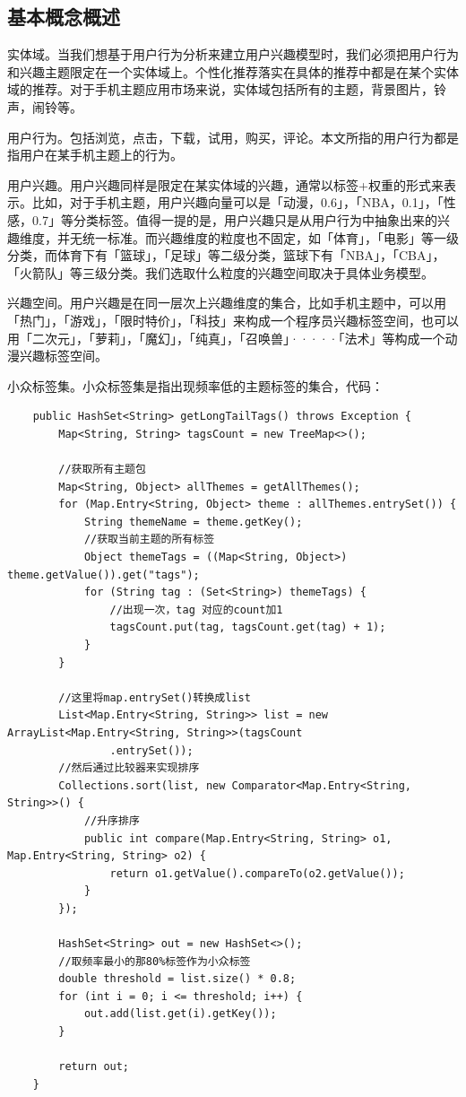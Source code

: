   \subsection{基本概念概述}
  实体域。当我们想基于用户行为分析来建立用户兴趣模型时，我们必须把用户行为和兴趣主题限定在一个实体域上。个性化推荐落实在具体的推荐中都是在某个实体域的推荐。对于手机主题应用市场来说，实体域包括所有的主题，背景图片，铃声，闹铃等。

  用户行为。包括浏览，点击，下载，试用，购买，评论。本文所指的用户行为都是指用户在某手机主题上的行为。
  
  用户兴趣。用户兴趣同样是限定在某实体域的兴趣，通常以标签+权重的形式来表示。比如，对于手机主题，用户兴趣向量可以是「动漫，0.6」，「NBA，0.1」，「性感，0.7」等分类标签。值得一提的是，用户兴趣只是从用户行为中抽象出来的兴趣维度，并无统一标准。而兴趣维度的粒度也不固定，如「体育」，「电影」等一级分类，而体育下有「篮球」，「足球」等二级分类，篮球下有「NBA」，「CBA」，「火箭队」等三级分类。我们选取什么粒度的兴趣空间取决于具体业务模型。

  兴趣空间。用户兴趣是在同一层次上兴趣维度的集合，比如手机主题中，可以用「热门」，「游戏」，「限时特价」，「科技」来构成一个程序员兴趣标签空间，也可以用「二次元」，「萝莉」，「魔幻」，「纯真」，「召唤兽」·····「法术」等构成一个动漫兴趣标签空间。

  小众标签集。小众标签集是指出现频率低的主题标签的集合，代码：
  \begin{lstlisting}
    public HashSet<String> getLongTailTags() throws Exception {
        Map<String, String> tagsCount = new TreeMap<>();

        //获取所有主题包
        Map<String, Object> allThemes = getAllThemes();
        for (Map.Entry<String, Object> theme : allThemes.entrySet()) {
            String themeName = theme.getKey();
            //获取当前主题的所有标签
            Object themeTags = ((Map<String, Object>) theme.getValue()).get("tags");
            for (String tag : (Set<String>) themeTags) {
                //出现一次，tag 对应的count加1
                tagsCount.put(tag, tagsCount.get(tag) + 1);
            }
        }

        //这里将map.entrySet()转换成list
        List<Map.Entry<String, String>> list = new ArrayList<Map.Entry<String, String>>(tagsCount
                .entrySet());
        //然后通过比较器来实现排序
        Collections.sort(list, new Comparator<Map.Entry<String, String>>() {
            //升序排序
            public int compare(Map.Entry<String, String> o1, Map.Entry<String, String> o2) {
                return o1.getValue().compareTo(o2.getValue());
            }
        });

        HashSet<String> out = new HashSet<>();
        //取频率最小的那80%标签作为小众标签
        double threshold = list.size() * 0.8;
        for (int i = 0; i <= threshold; i++) {
            out.add(list.get(i).getKey());
        }

        return out;
    }
  \end{lstlisting}

